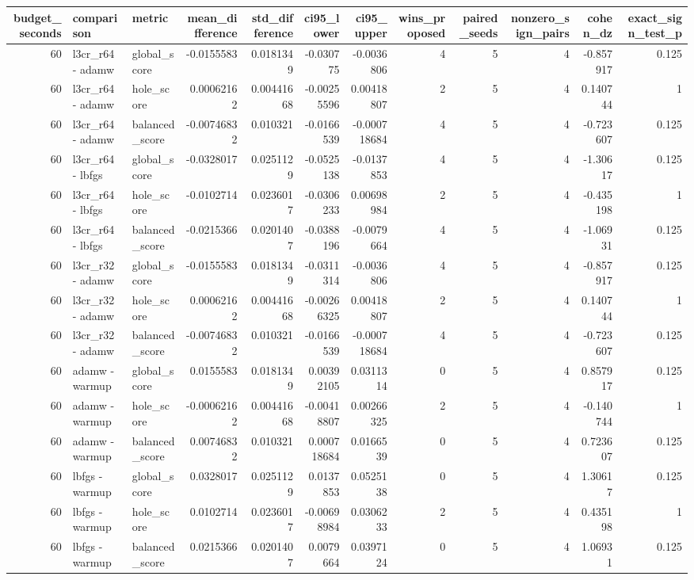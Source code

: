\begin{tabular}{rllrrrrrrrrr}
\toprule
budget_seconds & comparison & metric & mean_difference & std_difference & ci95_lower & ci95_upper & wins_proposed & paired_seeds & nonzero_sign_pairs & cohen_dz & exact_sign_test_p \\
\midrule
60 & l3cr_r64 - adamw & global_score & -0.0155583 & 0.0181349 & -0.030775 & -0.0036806 & 4 & 5 & 4 & -0.857917 & 0.125 \\
60 & l3cr_r64 - adamw & hole_score & 0.00062162 & 0.00441668 & -0.00255596 & 0.00418807 & 2 & 5 & 4 & 0.140744 & 1 \\
60 & l3cr_r64 - adamw & balanced_score & -0.00746832 & 0.010321 & -0.0166539 & -0.000718684 & 4 & 5 & 4 & -0.723607 & 0.125 \\
60 & l3cr_r64 - lbfgs & global_score & -0.0328017 & 0.0251129 & -0.0525138 & -0.0137853 & 4 & 5 & 4 & -1.30617 & 0.125 \\
60 & l3cr_r64 - lbfgs & hole_score & -0.0102714 & 0.0236017 & -0.0306233 & 0.00698984 & 2 & 5 & 4 & -0.435198 & 1 \\
60 & l3cr_r64 - lbfgs & balanced_score & -0.0215366 & 0.0201407 & -0.0388196 & -0.0079664 & 4 & 5 & 4 & -1.06931 & 0.125 \\
60 & l3cr_r32 - adamw & global_score & -0.0155583 & 0.0181349 & -0.0311314 & -0.0036806 & 4 & 5 & 4 & -0.857917 & 0.125 \\
60 & l3cr_r32 - adamw & hole_score & 0.00062162 & 0.00441668 & -0.00266325 & 0.00418807 & 2 & 5 & 4 & 0.140744 & 1 \\
60 & l3cr_r32 - adamw & balanced_score & -0.00746832 & 0.010321 & -0.0166539 & -0.000718684 & 4 & 5 & 4 & -0.723607 & 0.125 \\
60 & adamw - warmup & global_score & 0.0155583 & 0.0181349 & 0.00392105 & 0.0311314 & 0 & 5 & 4 & 0.857917 & 0.125 \\
60 & adamw - warmup & hole_score & -0.00062162 & 0.00441668 & -0.00418807 & 0.00266325 & 2 & 5 & 4 & -0.140744 & 1 \\
60 & adamw - warmup & balanced_score & 0.00746832 & 0.010321 & 0.000718684 & 0.0166539 & 0 & 5 & 4 & 0.723607 & 0.125 \\
60 & lbfgs - warmup & global_score & 0.0328017 & 0.0251129 & 0.0137853 & 0.0525138 & 0 & 5 & 4 & 1.30617 & 0.125 \\
60 & lbfgs - warmup & hole_score & 0.0102714 & 0.0236017 & -0.00698984 & 0.0306233 & 2 & 5 & 4 & 0.435198 & 1 \\
60 & lbfgs - warmup & balanced_score & 0.0215366 & 0.0201407 & 0.0079664 & 0.0397124 & 0 & 5 & 4 & 1.06931 & 0.125 \\

\end{tabular}
